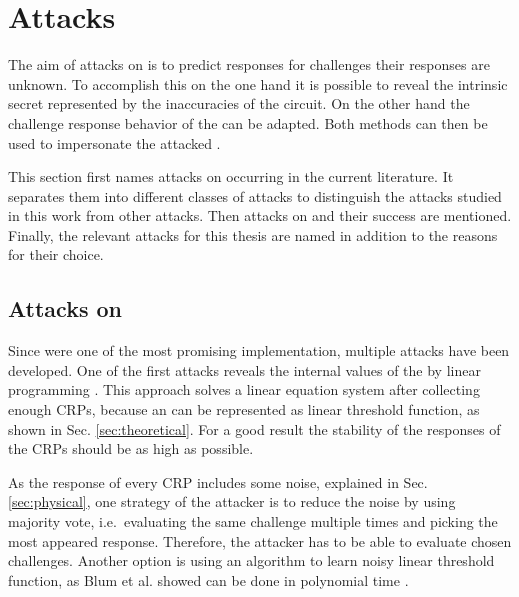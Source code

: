 \chapter{Attacks}
\label{cap:attacks}

The aim of attacks on \apuf is to predict responses for challenges their responses are unknown.
To accomplish this on the one hand it is possible to reveal the intrinsic secret represented by the inaccuracies of the \apuf circuit.
On the other hand the challenge response behavior of the \puf can be adapted.
Both methods can then be used to impersonate the attacked \puf.

This section first names attacks on \apufs occurring in the current literature.
It separates them into different classes of attacks to distinguish the attacks studied in this work from other attacks.
Then attacks on \xpufs and their success are mentioned.
Finally, the relevant attacks for this thesis are named in addition to the reasons for their choice.


\section{Attacks on \apufs}
\label{sec:attacksonarbiter}

Since \apufs were one of the most promising \puf implementation, multiple attacks have been developed.
One of the first attacks reveals the internal values of the \apuf by linear programming \cite{Ozturk2008TowardsDevices}.
This approach solves a linear equation system after collecting enough \acp{CRP}, because an \apuf can be represented as linear threshold function, as shown in Sec. \ref{sec:theoretical}. %
For a good result the stability of the responses of the \acp{CRP} should be as high as possible.

As the response of every \ac{CRP} includes some noise, explained in Sec. \ref{sec:physical}, one strategy of the attacker is to reduce the noise by using majority vote, i.e.\ evaluating the same challenge multiple times and picking the most appeared response.
Therefore, the attacker has to be able to evaluate chosen challenges. %
Another option is using an algorithm to learn noisy linear threshold function, as Blum et al. showed can be done in polynomial time \cite{Blum1998AlgorithmicaNoisy}.


